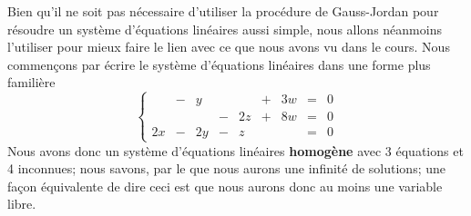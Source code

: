 Bien qu'il ne soit pas nécessaire d'utiliser la procédure de Gauss-Jordan
pour résoudre un système d'équations linéaires aussi simple, 
nous allons néanmoins l'utiliser pour mieux faire le lien avec ce que nous avons vu dans le cours.
Nous commençons par écrire le système d'équations linéaires dans une forme
plus familière
\[
\left\{
\begin{matrix}
&-& y && &+& 3w &=& 0 \\
&& &-& 2z &+& 8w &=& 0 \\
2x &-& 2y &-& z && &=& 0
\end{matrix}
\right.
\]
Nous avons donc un système d'équations linéaires \textbf{homogène} avec 3 équations et 4 inconnues;
nous savons, par le  que nous aurons une infinité de solutions; 
une façon équivalente de dire ceci est que nous aurons donc au moins une variable libre.

